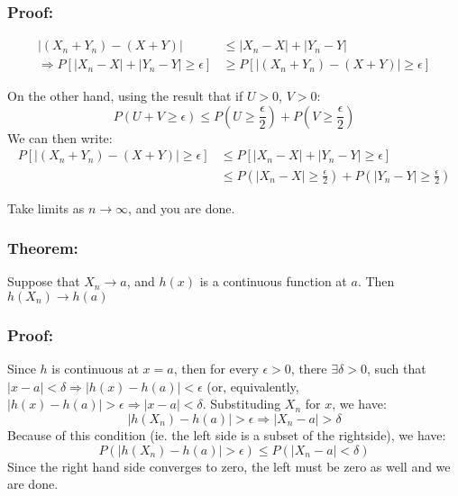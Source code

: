 \documentclass{article}
\begin{document}
\subsubsection*{Proof:}
\begin{equation*}
    \begin{split}
        |(X_n + Y_n) - (X+Y)| &\leq |X_n-X| + |Y_n - Y|\\
        \Rightarrow P\left[|X_n - X| + |Y_n - Y| \geq \epsilon\right] &\geq P\left[|(X_n + Y_n) - (X+Y)| \geq \epsilon\right]
    \end{split}
\end{equation*}

On the other hand, using the result that if $U>0$, $V>0$:
\begin{equation*}
    P(U+V\geq \epsilon) \leq P\left(U \geq \frac{\epsilon}{2} \right) + P\left(V \geq \frac{\epsilon}{2} \right)
\end{equation*}
We can then write:
\begin{equation*}
    \begin{split}
          P\left[|(X_n + Y_n) - (X+Y)| \geq \epsilon\right] &\leq P\left[|X_n - X| + |Y_n - Y| \geq \epsilon\right]\\
          &\leq P\left(|X_n - X| \geq \frac{\epsilon}{2} \right) + P\left(|Y_n - Y| \geq \frac{\epsilon}{2} \right)
    \end{split}
\end{equation*}

Take limits as $n\to\infty$, and you are done.

\subsubsection{Theorem:}

Suppose that $X_n \to a$, and $h(x)$ is a continuous function at $a$. Then $h(X_n) \to h(a)$
\subsubsection*{Proof:}
Since $h$ is continuous at $x=a$, then for every $\epsilon >0$, there $\exists \delta > 0$, such that $|x-a|<\delta\Rightarrow |h(x)-h(a)|<\epsilon$ (or, equivalently, $|h(x)-h(a)|>\epsilon \Rightarrow |x-a|<\delta$. Substituding $X_n$ for $x$, we have:
\begin{equation*}
    |h(X_n) - h(a)| > \epsilon \Rightarrow |X_n-a|>\delta
\end{equation*}
Because of this condition (ie. the left side is a subset of the rightside), we have:
\begin{equation*}
    P(|h(X_n)-h(a)| > \epsilon) \leq P(|X_n-a|<\delta)
\end{equation*}
Since the right hand side converges to zero, the left must be zero as well and we are done.  
\end{document}
